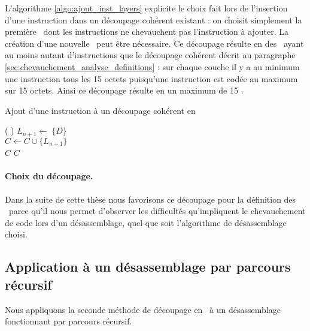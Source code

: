 
L'algorithme \ref{algo:ajout_inst_layers} explicite le choix fait lors de l'insertion d'une instruction dans un découpage cohérent existant : on choisit simplement la première \layer\ dont les instructions ne chevauchent pas l'instruction à ajouter. La création d'une nouvelle \layer\ peut être nécessaire. 
Ce découpage résulte en des \layers\ ayant au moins autant d'instructions que le découpage cohérent décrit au paragraphe \ref{sec:chevauchement_analyse_definitions} : sur chaque couche il y a au minimum une instruction tous les 15 octets puisqu'une instruction est codée au maximum sur 15 octets. Ainsi ce découpage résulte en un maximum de 15 \layers.

\begin{algorithm}[H] %
\caption{Ajout d'une instruction à un découpage cohérent en \layers}
\SetAlgoLined
{}
\Fn(
){}{
 {
  $L_{n+1}\leftarrow\ \{D\}$ \\
  $C\leftarrow C\cup\{L_{n+1}\}$ \\
  \Return $C$
}
{
  \Return $C$
}
}
\label{algo:ajout_inst_layers}
\end{algorithm}


\paragraph{Choix du découpage.}
Dans la suite de cette thèse nous favorisons ce découpage pour la définition des \layers\ parce qu'il nous permet d'observer les difficultés qu'impliquent le chevauchement de code lors d'un désassemblage, quel que soit l'algorithme de désassemblage choisi.

\subsection{Application à un désassemblage par parcours récursif}
Nous appliquons la seconde méthode de découpage en \layers\ à un désassemblage fonctionnant par parcours récursif.

